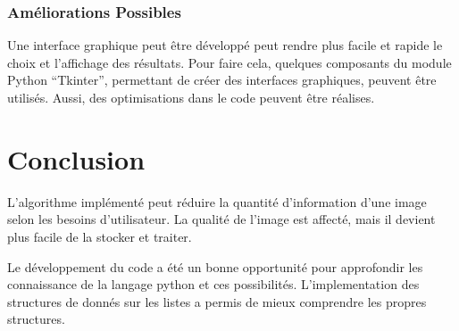 \documentclass{rapportECL}
\begin{document}






\subsubsection{Améliorations Possibles}

Une interface graphique peut être développé peut rendre plus facile et rapide le choix et l'affichage des résultats. Pour faire cela, quelques composants du  module  Python “Tkinter”, permettant de créer des interfaces graphiques, peuvent être utilisés. Aussi, des optimisations dans le code peuvent être réalises.

\section{Conclusion}

L'algorithme implémenté peut réduire la quantité d'information d'une image selon les besoins d'utilisateur. La qualité de l'image est affecté, mais il devient plus facile de la stocker et traiter.

Le développement du code a été un bonne opportunité pour approfondir les connaissance de la langage python et ces possibilités. L'implementation des structures de donnés sur les listes a permis de mieux comprendre les propres structures.
\end{document}
